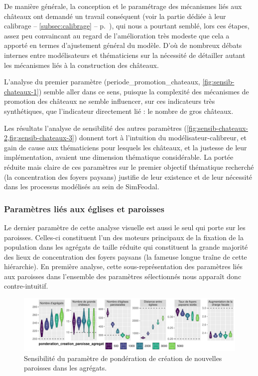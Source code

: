 De manière générale, la conception et le paramétrage des mécanismes liés aux châteaux ont demandé un travail conséquent (voir la partie dédiée à leur calibrage -- \cref{subsec:calibrage} -- p.~\pageref{subsubsec:calibrage-chateaux}), qui nous a pourtant semblé, lors ces étapes, assez peu convaincant au regard de l'amélioration très modeste que cela a apporté en termes d'ajustement général du modèle.
D'où de nombreux débats internes entre modélisateurs et thématiciens sur la nécessité de détailler autant les mécanismes liés à la construction des châteaux.

L'analyse du premier paramètre (\textsf{periode\_promotion\_chateaux}, \cref{fig:sensib-chateaux-1}) semble aller dans ce sens, puisque la complexité des mécanismes de promotion des châteaux ne semble influencer, sur ces indicateurs très synthétiques, que l'indicateur directement lié : le nombre de gros châteaux.

Les résultats l'analyse de sensibilité des autres paramètres (\cref{fig:sensib-chateaux-2,fig:sensib-chateaux-3}) donnent tort à l'intuition du modélisateur-\og calibreur\fg{}, et gain de cause aux thématiciens pour lesquels les châteaux, et la justesse de leur implémentation, avaient une dimension thématique considérable.
La portée réduite mais claire de ces paramètres sur le premier objectif thématique recherché (la concentration des foyers paysans) justifie de leur existence et de leur nécessité dans les processus modélisés au sein de SimFeodal.

\subsubsection{Paramètres liés aux églises et paroisses}

Le dernier paramètre de cette analyse visuelle est aussi le seul qui porte sur les paroisses.
Celles-ci constituent l'un des moteurs principaux de la fixation de la population dans les agrégats de taille réduite qui constituent la grande majorité des lieux de concentration des foyers paysans (la fameuse \og longue traîne\fg{} de cette hiérarchie).
En première analyse, cette sous-représentation des paramètres liés aux paroisses dans l'ensemble des paramètres sélectionnés nous apparaît donc contre-intuitif.

\begin{figure}[H]
	\centering
	\includegraphics[width=\linewidth]{img/sensib/sensibilite_ponderation_creation_paroisse_agregat.pdf}
	\caption{Sensibilité du paramètre de pondération de création de nouvelles paroisses dans les agrégats.}
	\label{fig:sensib-paroisses}
\end{figure}

